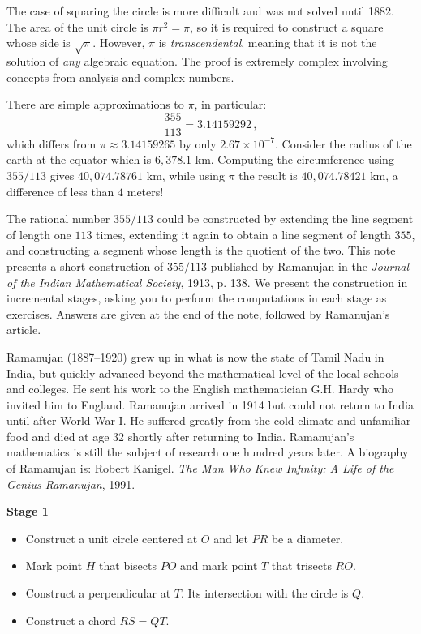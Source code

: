 \documentclass[11pt,a4paper]{report}
\begin{document}
The case of squaring the circle is more difficult and was not solved until 1882. The area of the unit circle is $\pi r^2=\pi$, so it is required to construct a square whose side is $\sqrt{\pi}$. However, $\pi$ is \emph{transcendental}, meaning that it is not the solution of \emph{any} algebraic equation. The proof is extremely complex involving concepts from analysis and complex numbers.

There are simple approximations to $\pi$, in particular:
\[
\frac{355}{113}=3.14159292\,,
\]
which differs from $\pi\approx 3.14159265$ by only $2.67\times 10^{-7}$. Consider the radius of the earth at the equator which is $6,378.1$ km. Computing the circumference using $355/113$ gives $40,074.78761$ km, while using $\pi$ the result is $40,074.78421$ km, a difference of less than $4$ meters!

The rational number $355/113$ could be constructed by extending the line segment of length one $113$ times, extending it again to obtain a line segment of length $355$, and constructing a segment whose length is the quotient of  the two. This note presents a short construction of $355/113$ published by Ramanujan in the \emph{Journal of the Indian Mathematical Society}, 1913, p. 138. We present the construction in incremental stages, asking you to perform the computations in each stage as exercises. Answers are given at the end of the note, followed by Ramanujan's article.

Ramanujan (1887--1920) grew up in what is now the state of Tamil Nadu in India, but quickly advanced beyond the mathematical level of the local schools and colleges. He sent his work to the English mathematician G.H. Hardy who invited him to England. Ramanujan arrived in 1914 but could not return to India until after World War I. He suffered greatly from the cold climate and unfamiliar food and died at age $32$ shortly after returning to India. Ramanujan's mathematics is still the subject of research one hundred years later. A biography of Ramanujan is: Robert Kanigel. \emph{The Man Who Knew Infinity: A Life of the Genius Ramanujan}, 1991.

\newpage


\begin{center}
\textbf{\Large Stage 1}
\end{center}

\begin{itemize}
\item Construct a unit circle centered at $O$ and let $PR$ be a diameter.
\item Mark point $H$ that bisects $PO$ and mark point $T$ that trisects $RO$.
\item Construct a perpendicular at $T$. Its intersection with the circle is $Q$.
\item Construct a chord $RS=QT$.
\end{itemize}
\end{document}
